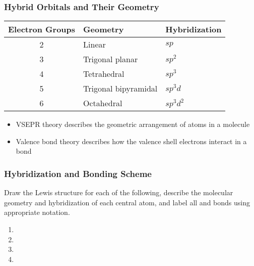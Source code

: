 \documentclass[handout]{beamer}
\begin{document}
\begin{frame}
	\frametitle{Hybrid Orbitals and Their Geometry}

	\begin{center}
	\begin{tabular}{c l l}
		\toprule
		\textbf{Electron Groups} & \textbf{Geometry} &
		\textbf{Hybridization} \\ \midrule
		2 & Linear & $sp$ \\
		3 & Trigonal planar & $sp^2$ \\
		4 & Tetrahedral & $sp^3$ \\
		5 & Trigonal bipyramidal & $sp^3d$ \\
		6 & Octahedral & $sp^3d^2$ \\
		\bottomrule
	\end{tabular}
	\end{center}

	\begin{itemize}
		\item VSEPR theory describes the geometric arrangement of atoms
			in a molecule
		\item Valence bond theory describes how the valence shell
			electrons interact in a bond
	\end{itemize}
\end{frame}

\begin{frame}[t]
	\frametitle{Hybridization and Bonding Scheme}
	Draw the Lewis structure for each of the following, describe the
	molecular geometry and hybridization of each central atom, and label all
	\textsigma{} and \textpi{} bonds using appropriate notation.
	\begin{enumerate}
		\item {}
		\vfill
		\item {}
		\vfill
		\item {}
		\vfill
		\item {}
		\vfill
	\end{enumerate}
\end{frame}


\end{document}
